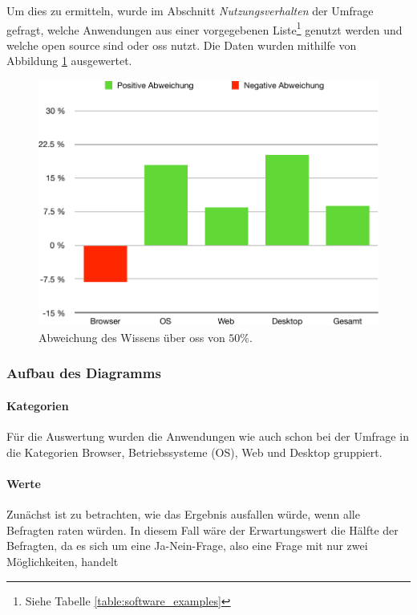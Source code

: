 \documentclass[a4paper]{article}
\begin{document}
            Um dies zu ermitteln, wurde im Abschnitt \emph{Nutzungsverhalten} der Umfrage gefragt, welche Anwendungen aus einer vorgegebenen Liste\footnote{Siehe Tabelle \ref{table:software_examples}} genutzt werden und welche open source sind oder \gls{oss} nutzt. Die Daten wurden mithilfe von Abbildung \ref{figure:knowledge_difference} ausgewertet.
            
                        
            \begin{figure}
                \includegraphics[width=\textwidth]{assets/results/openSourceJudging/openSourceJudgingDetailedOSSOnly2.pdf}
                \caption{Abweichung des Wissens über \gls{oss} von $50 \%$.}
                \label{figure:knowledge_difference}
            \end{figure}
            
            
            \subsubsection{Aufbau des Diagramms}
                \paragraph{Kategorien}
                    Für die Auswertung wurden die Anwendungen wie auch schon bei der Umfrage in die Kategorien Browser, Betriebssysteme (OS), Web und Desktop gruppiert.
                    
                \paragraph{Werte}
                    Zunächst ist zu betrachten, wie das Ergebnis ausfallen würde, wenn alle Befragten raten würden. In diesem Fall wäre der Erwartungswert die Hälfte der Befragten, da es sich um eine Ja-Nein-Frage, also eine Frage mit nur zwei Möglichkeiten, handelt
                    
\end{document}

